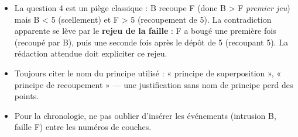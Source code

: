 \documentclass[11pt]{article}
\begin{document}
\begin{attention}
\begin{itemize}
\item La question 4 est un piège classique : B recoupe F (donc B > F \emph{premier jeu}) mais B < 5 (scellement) et F > 5 (recoupement de 5). La contradiction apparente se lève par le \textbf{rejeu de la faille} : F a bougé une première fois (recoupé par B), puis une seconde fois après le dépôt de 5 (recoupant 5). La rédaction attendue doit expliciter ce rejeu.
\item Toujours citer le nom du principe utilisé : « principe de superposition », « principe de recoupement » — une justification sans nom de principe perd des points.
\item Pour la chronologie, ne pas oublier d'insérer les événements (intrusion B, faille F) entre les numéros de couches.
\end{itemize}
\end{attention}
\end{document}
